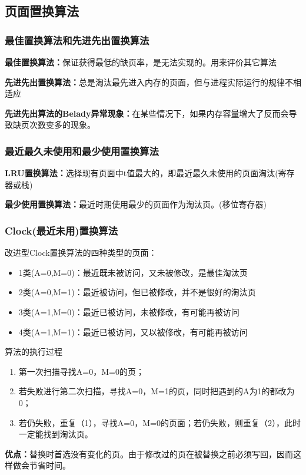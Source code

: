 \documentclass{article}
\begin{document}
\subsection{页面置换算法}
\subsubsection{\color{red}最佳置换算法和先进先出置换算法}
\textbf{最佳置换算法：}保证获得最低的缺页率，是无法实现的。用来评价其它算法

\textbf{先进先出置换算法：}总是淘汰最先进入内存的页面，但与进程实际运行的规律不相适应

\textbf{先进先出算法的Belady异常现象：}在某些情况下，如果内存容量增大了反而会导致缺页次数变多的现象。


\subsubsection{\color{red}最近最久未使用和最少使用置换算法}
\textbf{LRU置换算法：}选择现有页面中t值最大的，即最近最久未使用的页面淘汰(寄存器或栈)

\textbf{最少使用置换算法：}最近时期使用最少的页面作为淘汰页。(移位寄存器)

\subsubsection{\color{red}Clock(最近未用)置换算法}
\noindent 改进型Clock置换算法的四种类型的页面：
\begin{itemize}
    \item 1类(A=0,M=0)：最近既未被访问，又未被修改，是最佳淘汰页
    \item 2类(A=0,M=1)：最近被访问，但已被修改，并不是很好的淘汰页
    \item 3类(A=1,M=0)：最近已被访问，未被修改，有可能再被访问
    \item 4类(A=1,M=1)：最近已被访问，又以被修改，有可能再被访问
\end{itemize}
算法的执行过程
\begin{enumerate}
    \item 第一次扫描寻找A=0，M=0的页；
    \item 若失败进行第二次扫描，寻找A=0，M=1的页，同时把遇到的A为1的都改为0；
    \item 若仍失败，重复（1），寻找A=0，M=0的页面；若仍失败，则重复（2），此时一定能找到淘汰页。
\end{enumerate}

\textbf{优点：}替换时首选没有变化的页。由于修改过的页在被替换之前必须写回，因而这样做会节省时间。
\end{document}
